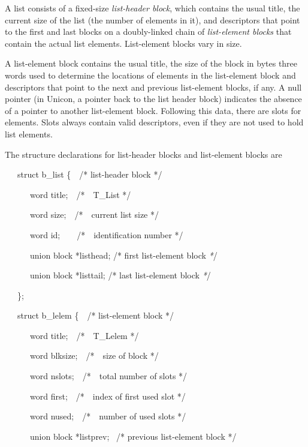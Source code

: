 A list consists of a fixed-size \textit{list-header block}, which
contains the usual title, the current size of the list (the number of
elements in it), and descriptors that point to the first and last
blocks on a doubly-linked chain of \textit{list-element blocks} that
contain the actual list elements. List-element blocks vary in size.


A list-element block contains the usual title, the size of the block
in bytes three words used to determine the locations of elements in
the list-element block and descriptors that point to the next and
previous list-element blocks, if any. A null pointer
\textcolor[rgb]{0.0,0.2784314,1.0}{(in Unicon, a pointer back to the
list header block)} indicates the absence of a pointer to another
list-element block. Following this data, there are slots for
elements. Slots always contain valid descriptors, even if they are not
used to hold list elements.


The structure declarations for list-header blocks and list-element blocks are

{\ttfamily\mdseries
\ \ \ struct b\_list \{\ \ /* list-header block */}

{\ttfamily\mdseries
\ \ \ \ \ \ word title;\ \ /*\ \ T\_List */}

{\ttfamily\mdseries
\ \ \ \ \ \ word size;\ \ /*\ \ current list size */}

{\ttfamily\mdseries
\ \ \ \ \ \ word id;\ \ \ \ /*\ \ identification number */}

{\ttfamily\mdseries
\ \ \ \ \ \ union block *listhead; /* first list-element block \textit{*}/}

{\ttfamily\mdseries
\ \ \ \ \ \ union block *listtail; /* last list-element block \textit{*}/}

{\ttfamily\mdseries
\ \ \ \};}

{\ttfamily\mdseries
\ \ \ struct b\_lelem \{\ \ /* list-element block */}

{\ttfamily\mdseries
\ \ \ \ \ \ word title;\ \ /*\ \ T\_Lelem */}

{\ttfamily\mdseries
\ \ \ \ \ \ word blksize;\ \ /*\ \ size of block */}

{\ttfamily\mdseries
\ \ \ \ \ \ word nslots;\ \ /*\ \ total number of slots */}

{\ttfamily\mdseries
\ \ \ \ \ \ word first;\ \ /*\ \ index of first used slot */}

{\ttfamily\mdseries
\ \ \ \ \ \ word nused;\ \ /*\ \ number of used slots */}

{\ttfamily\mdseries
\ \ \ \ \ \ union block *listprev; \ /* previous list-element block */}

